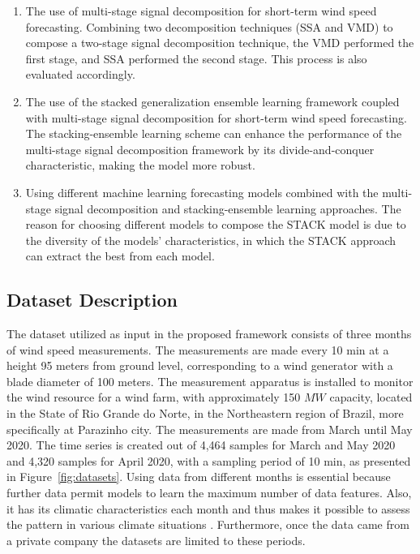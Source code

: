 \begin{enumerate}[label=\alph*)]

    \item The use of multi-stage signal decomposition for short-term wind speed forecasting. Combining two decomposition techniques (\ac{SSA} and \ac{VMD}) to compose a two-stage signal decomposition technique, the \ac{VMD} performed the first stage, and \ac{SSA} performed the second stage. This process is also evaluated accordingly.
    
    \item The use of the stacked generalization ensemble learning framework coupled with multi-stage signal decomposition for short-term wind speed forecasting. The stacking-ensemble learning scheme can enhance the performance of the multi-stage signal decomposition framework by its divide-and-conquer characteristic, making the model more robust.
    
    \item Using different machine learning forecasting models combined with the multi-stage signal decomposition and stacking-ensemble learning approaches. The reason for choosing different models to compose the \ac{STACK} model is due to the diversity of the models' characteristics, in which the \ac{STACK} approach can extract the best from each model.
    
\end{enumerate}

\subsection{Dataset Description}

The dataset utilized as input in the proposed framework consists of three months of wind speed measurements. The measurements are made every 10 min at a height 95 meters from ground level, corresponding to a wind generator with a blade diameter of 100 meters. The measurement apparatus is installed to monitor the wind resource for a wind farm, with approximately 150 $MW$ capacity, located in the State of Rio Grande do Norte, in the Northeastern region of Brazil, more specifically at Parazinho city. The measurements are made from March until May 2020. The time series is created out of 4,464 samples for March and May 2020 and 4,320 samples for April 2020, with a sampling period of 10 min, as presented in Figure~\ref{fig:datasets}. Using data from different months is essential because further data permit models to learn the maximum number of data features. Also, it has its climatic characteristics each month and thus makes it possible to assess the pattern in various climate situations \cite{dasilva2021Novel}. Furthermore, once the data came from a private company the datasets are limited to these periods.

